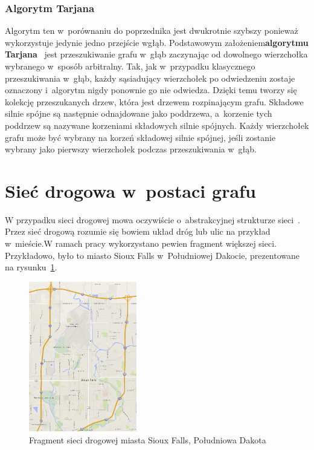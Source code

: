 \documentclass[twoside,12pt]{report}
\begin{document}
\subsubsection{Algorytm Tarjana}
Algorytm ten w~porównaniu do poprzednika jest dwukrotnie szybszy ponieważ wykorzystuje jedynie jedno przejście wgłąb. Podstawowym założeniem\textbf{algorytmu  Tarjana}~\cite{tarjan} jest przeszukiwanie grafu w~głąb zaczynając od dowolnego wierzchołka wybranego w~sposób arbitralny. Tak, jak w~przypadku klasycznego przeszukiwania w~głąb, każdy sąsiadujący wierzchołek po odwiedzeniu zostaje oznaczony i~algorytm nigdy ponownie go nie odwiedza. Dzięki temu tworzy się kolekcję przeszukanych drzew, która jest drzewem rozpinającym grafu. Składowe silnie spójne są następnie odnajdowane jako poddrzewa, a~korzenie tych poddrzew są nazywane korzeniami składowych silnie spójnych. Każdy wierzchołek grafu może być wybrany na korzeń składowej silnie spójnej, jeśli zostanie wybrany jako pierwszy wierzchołek podczas przeszukiwania w~głąb.



\section{Sieć drogowa w~postaci grafu}
W przypadku sieci drogowej mowa oczywiście o~abstrakcyjnej strukturze sieci~\cite{reducingtheeffects}. Przez sieć drogową rozumie się bowiem układ dróg lub ulic na przykład w~mieście.W ramach pracy wykorzystano pewien fragment większej sieci. Przykładowo, było to miasto Sioux Falls w~Południowej Dakocie, prezentowane na rysunku~\ref{fig:fragment_sieci_siouxfalls}.

\begin{figure}[htbp]
	\centering
	\includegraphics[width=0.42\textwidth]{img/siec}
	\caption{Fragment sieci drogowej miasta Sioux Falls, Południowa Dakota} 
	\label{fig:fragment_sieci_siouxfalls}
\end{figure}
\end{document}
